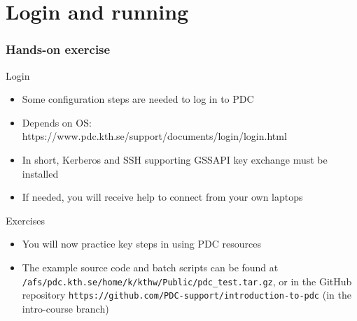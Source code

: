 \section*{Login and running}

\begin{frame}[fragile]
  \frametitle{Hands-on exercise}

\footnotesize
\begin{exampleblock}{\large{Login}}
\begin{itemize}
  \item Some configuration steps are needed to log in to PDC 
  \item Depends on OS: https://www.pdc.kth.se/support/documents/login/login.html
  \item In short, Kerberos and SSH supporting GSSAPI key exchange must be installed 
  \item If needed, you will receive help to connect from your own laptops
\end{itemize}
\end{exampleblock}

\begin{exampleblock}{\large{Exercises}}
\begin{itemize}
  \item You will now practice key steps in using PDC resources
  \item The example source code and batch scripts can be found at \verb|/afs/pdc.kth.se/home/k/kthw/Public/pdc_test.tar.gz|,
    or in the GitHub repository \verb|https://github.com/PDC-support/introduction-to-pdc| (in the intro-course branch)
\end{itemize}
\end{exampleblock}

\end{frame}



